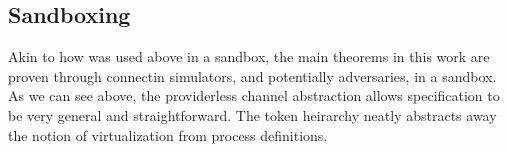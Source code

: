 \subsection{Sandboxing}
Akin to how \Fro was used above in a sandbox, the main theorems in this work are proven through connectin simulators, and potentially adversaries, in a sandbox. 
As we can see above, the providerless channel abstraction allows specification to be very general and straightforward. 
The token heirarchy neatly abstracts away the notion of virtualization from process definitions. 






